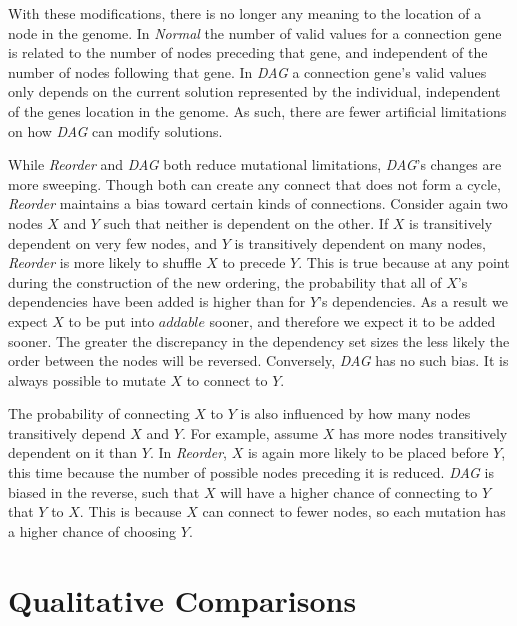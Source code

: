 \documentclass[journal]{IEEEtran}
\begin{document}
With these modifications, there is no longer any meaning to the location of a node
in the genome.  In \emph{Normal} the number of valid
values for a connection gene is related to the number of nodes
preceding that gene, and independent of the number of nodes following that gene.
In \emph{DAG} a connection gene's valid values only depends on the current solution
represented by the individual, independent of the genes location in the genome.
As such, there are fewer artificial limitations on how \emph{DAG} can modify
solutions.

While \emph{Reorder} and \emph{DAG} both reduce mutational limitations, \emph{DAG}'s changes are more sweeping.
Though both can create any connect that does not form a cycle,
\emph{Reorder} maintains a bias toward certain kinds of connections.
Consider again two nodes $X$ and $Y$
such that neither is dependent on the other.  If $X$ is transitively dependent on very
few nodes, and $Y$ is transitively dependent on many nodes, \emph{Reorder} is more likely
to shuffle $X$ to precede $Y$.  This is true because at any point during the construction
of the new ordering, the probability
that all of $X$'s dependencies have been added is
higher than for $Y$'s dependencies.  As a result we expect $X$ to be put into $addable$ sooner,
and therefore we expect it to be added sooner.  The greater the discrepancy in the dependency
set sizes the less likely the order between the nodes will be reversed.
Conversely, \emph{DAG} has no such bias.  It is always possible to mutate $X$ to connect to $Y$.

The probability of connecting $X$ to $Y$ is also influenced by how many nodes transitively depend $X$ and $Y$.
For example, assume $X$ has more nodes transitively dependent on it than $Y$.
In \emph{Reorder}, $X$ is again more likely to be placed before $Y$, this time because the number
of possible nodes preceding it is reduced.  \emph{DAG} is biased in the reverse, such that $X$ will
have a higher chance of connecting to $Y$ that $Y$ to $X$.  This is because $X$ can connect to fewer
nodes, so each mutation has a higher chance of choosing $Y$.

\section{Qualitative Comparisons}
\label{sec:quality}
\end{document}
